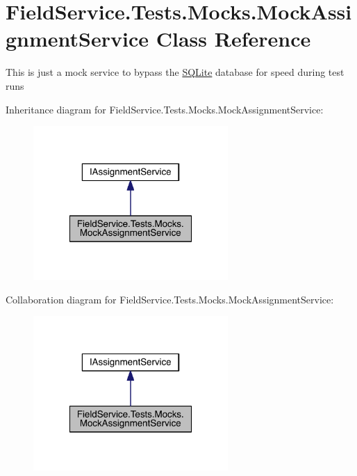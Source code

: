 \hypertarget{class_field_service_1_1_tests_1_1_mocks_1_1_mock_assignment_service}{\section{Field\+Service.\+Tests.\+Mocks.\+Mock\+Assignment\+Service Class Reference}
\label{class_field_service_1_1_tests_1_1_mocks_1_1_mock_assignment_service}
}


This is just a mock service to bypass the \hyperlink{namespace_s_q_lite}{S\+Q\+Lite} database for speed during test runs  




Inheritance diagram for Field\+Service.\+Tests.\+Mocks.\+Mock\+Assignment\+Service\+:
\nopagebreak
\begin{figure}[H]
\begin{center}
\leavevmode
\includegraphics[width=210pt]{class_field_service_1_1_tests_1_1_mocks_1_1_mock_assignment_service__inherit__graph}
\end{center}
\end{figure}


Collaboration diagram for Field\+Service.\+Tests.\+Mocks.\+Mock\+Assignment\+Service\+:
\nopagebreak
\begin{figure}[H]
\begin{center}
\leavevmode
\includegraphics[width=210pt]{class_field_service_1_1_tests_1_1_mocks_1_1_mock_assignment_service__coll__graph}
\end{center}
\end{figure}
